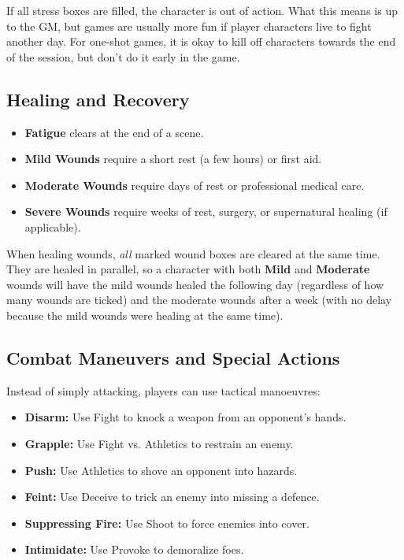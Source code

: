 \begin{multicols}{2}
If all stress boxes are filled, the character is out of action. What this means is up to the GM, but games are usually more fun if player characters live to fight another day. For one-shot games, it is okay to kill off characters towards the end of the session, but don't do it early in the game.


\subsection{Healing and Recovery}\label{core:healing}

\begin{itemize}
    \item \textbf{Fatigue} clears at the end of a scene.
    \item \textbf{Mild Wounds} require a short rest (a few hours) or first aid.
    \item \textbf{Moderate Wounds} require days of rest or professional medical care.
    \item \textbf{Severe Wounds} require weeks of rest, surgery, or supernatural healing (if applicable).
\end{itemize}

When healing wounds, \emph{all} marked wound boxes are cleared at the same time. They are healed in parallel, so a character with both \textbf{Mild} and \textbf{Moderate} wounds will have the mild wounds healed the following day (regardless of how many wounds are ticked) and the moderate wounds after a week (with no delay because the mild wounds were healing at the same time).

\subsection{Combat Maneuvers and Special Actions}
Instead of simply attacking, players can use tactical manoeuvres:

\begin{Example}
	\begin{itemize}
    	\item \textbf{Disarm:} Use Fight to knock a weapon from an opponent’s hands.
	    \item \textbf{Grapple:} Use Fight vs. Athletics to restrain an enemy.
    	\item \textbf{Push:} Use Athletics to shove an opponent into hazards.
	    \item \textbf{Feint:} Use Deceive to trick an enemy into missing a defence.
    	\item \textbf{Suppressing Fire:} Use Shoot to force enemies into cover.
	    \item \textbf{Intimidate:} Use Provoke to demoralize foes.
	\end{itemize}
\end{Example}


\end{multicols}
